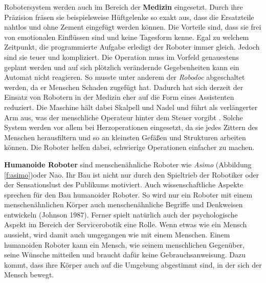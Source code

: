 Robotersystem werden auch im Bereich der \textbf{Medizin} eingesetzt. Durch ihre Präzision fräsen sie beispielsweise Hüftgelenke so exakt aus, dass die Ersatzteile nahtlos und ohne Zement eingefügt werden können. Die Vorteile sind, dass sie frei von emotionalen Einflüssen sind und keine Tagesform kenne. Egal zu welchem Zeitpunkt, die programmierte Aufgabe erledigt der Roboter immer gleich. Jedoch sind sie teuer und kompliziert. Die Operation muss im Vorfeld genauestens geplant werden und auf sich plötzlich verändernde Gegebenheiten kann ein Automat nicht reagieren. So musste unter anderem der \textit{Robodoc} abgeschaltet werden, da er Menschen Schaden zugefügt hat. Dadurch hat sich derzeit der Einsatz von Robotern in der Medizin eher auf die Form eines Assistenten reduziert. Die Maschine hält dabei Skalpell und Nadel und führt als verlängerter Arm aus, was der menschliche Operateur hinter dem Steuer vorgibt \cite{Haun2007}. Solche System werden vor allem bei Herzoperationen eingesetzt, da sie jedes Zittern des Menschen herausfiltern und so an kleinsten Gefäßen und Strukturen arbeiten können. Die Roboter helfen dabei, schwierige Operationen einfacher zu machen.

\textbf{Humanoide Roboter} sind menschenähnliche Roboter wie \textit{Asimo} (Abbildung \ref{f:asimo})oder Nao. Ihr Bau ist nicht nur durch den Spieltrieb der Robotiker oder der Sensationslust des Publikums motiviert. Auch wissenschaftliche Aspekte sprechen für den Bau humanoider Roboter. So wird nur ein Roboter mit einem menschenähnlichen Körper auch menschenähnliche Begriffe und Denkweisen entwickeln (Johnson 1987). Ferner spielt natürlich auch der psychologische Aspekt im Bereich der Servicerobotik eine Rolle. Wenn etwas wie ein Mensch aussieht, wird damit auch umgegangen wie mit einem Menschen. Einem humanoiden Roboter kann ein Mensch, wie seinem menschlichen Gegenüber, seine Wünsche mitteilen und braucht dafür keine Gebrauchsanweisung. Dazu kommt, dass ihre Körper auch auf die Umgebung abgestimmt sind, in der sich der Mensch bewegt.


